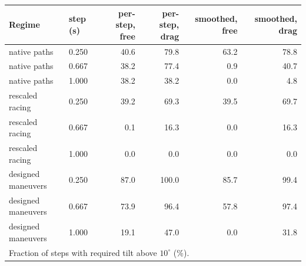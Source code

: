 \footnotesize
\begin{tabular}{llrrrr}
\toprule
Regime & step (s) & per-step, free & per-step, drag & smoothed, free & smoothed, drag \\
\midrule
native paths & 0.250 & 40.6 & 79.8 & 63.2 & 78.8 \\
native paths & 0.667 & 38.2 & 77.4 & 0.9 & 40.7 \\
native paths & 1.000 & 38.2 & 38.2 & 0.0 & 4.8 \\
rescaled racing & 0.250 & 39.2 & 69.3 & 39.5 & 69.7 \\
rescaled racing & 0.667 & 0.1 & 16.3 & 0.0 & 16.3 \\
rescaled racing & 1.000 & 0.0 & 0.0 & 0.0 & 0.0 \\
designed maneuvers & 0.250 & 87.0 & 100.0 & 85.7 & 99.4 \\
designed maneuvers & 0.667 & 73.9 & 96.4 & 57.8 & 97.4 \\
designed maneuvers & 1.000 & 19.1 & 47.0 & 0.0 & 31.8 \\
\bottomrule
\multicolumn{6}{l}{\footnotesize Fraction of steps with required tilt above $10^\circ$ (\%).} \\
\end{tabular}
